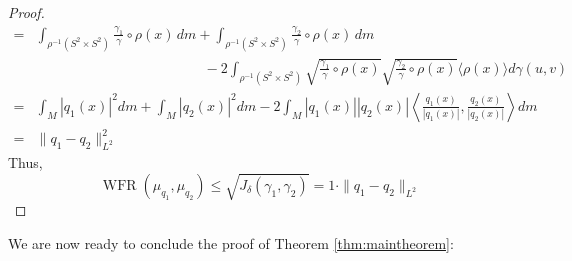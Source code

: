 \documentclass[final,hidelinks,onefignum,onetabnum]{siamart220329}
\newcommand{\WFR}{\operatorname{WFR}}
\begin{document}
\begin{proof}
\begin{align*}
    =&\int_{\rho^{-1}(S^2\times S^2)}\frac{\gamma_1}{\gamma}\circ \rho (x)\, dm +\int_{\rho^{-1}(S^2\times S^2)}\frac{\gamma_2}{\gamma}\circ \rho (x)\,dm\\
    &\qquad\qquad\qquad\qquad\qquad\qquad-2\int_{\rho^{-1}(S^2\times S^2)}\sqrt{\frac{\gamma_1}{\gamma}\circ\rho(x)}\sqrt{\frac{\gamma_2}{\gamma}\circ\rho(x)}\langle\rho(x)\rangle d\gamma(u,v)\\
    =&\int_{M}|{q_1}(x)|^2 dm+\int_{M} |q_2(x)|^2 dm-2\int_{M} |{q_1}(x)||q_2(x)| \left\langle \frac{{q_1}(x)}{|{q_1}(x)|},\frac{q_2(x)}{|q_2(x)|}\right\rangle dm\\
    =&\|{q_1}-q_2\|^2_{L^2}
\end{align*}
Thus, \[\WFR(\mu_{q_1},\mu_{q_2})\leq \sqrt{J_\delta(\gamma_1,\gamma_2)}= 1 \cdot \|q_1-q_2\|_{L^2}\]
\end{proof}
We are now ready to conclude the proof of Theorem \ref{thm:maintheorem}:
\end{document}
